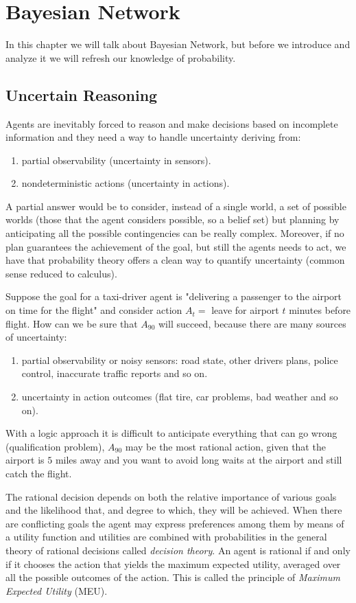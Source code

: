 \chapter{Bayesian Network}
In this chapter we will talk about Bayesian Network, but before we introduce and analyze
it we will refresh our knowledge of probability.

\section{Uncertain Reasoning}
Agents are inevitably forced to reason and make decisions based on incomplete information 
and they need a way to handle uncertainty deriving from:
\begin{enumerate}
   \item partial observability (uncertainty in sensors).
   \item nondeterministic actions (uncertainty in actions).
\end{enumerate}
A partial answer would be to consider, instead of a single world, a set of possible
worlds (those that the agent considers possible, so a belief set) but planning by
anticipating all the possible contingencies can be really complex.\newline
Moreover, if no plan guarantees the achievement of the goal, but still the agents
needs to act, we have that probability theory offers a clean way
to quantify uncertainty (common sense reduced to calculus).

Suppose the goal for a taxi-driver agent is "delivering a passenger to the airport
on time for the flight" and consider action $A_t = $ leave for airport $t$ minutes
before flight.\newline
How can we be sure that $A_{90}$ will succeed, because there are many sources of uncertainty:
\begin{enumerate}
   \item partial observability or noisy sensors: road state, other drivers plans,
	 police control, inaccurate traffic reports and so on.
   \item uncertainty in action outcomes (flat tire, car problems, bad weather and so on).
\end{enumerate}
With a logic approach it is difficult to anticipate everything that can go wrong
(qualification problem), $A_{90}$ may be the most rational action, given that the
airport is $5$ miles away and you want to avoid long waits at the airport and still
catch the flight.

The rational decision depends on both the relative importance of various goals
and the likelihood that, and degree to which, they will be achieved.\newline
When there are conflicting goals the agent may express preferences among
them by means of a utility function and utilities are combined with probabilities
in the general theory of rational decisions called \emph{decision theory}.\newline
An agent is rational if and only if it chooses the action that yields the maximum
expected utility, averaged over all the possible outcomes of the action.\newline
This is called the principle of \emph{Maximum Expected Utility} (MEU).


